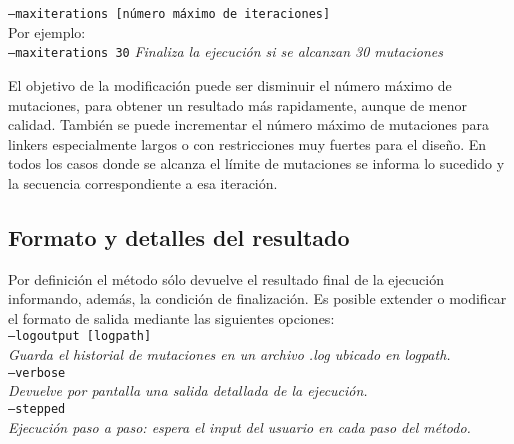 \indent \texttt{--maxiterations [número máximo de iteraciones]} 
\\Por ejemplo: \\
\indent \texttt{--maxiterations 30} \hspace{0.5cm} \textit{Finaliza la ejecución si se alcanzan 30 mutaciones}


El objetivo de la modificación puede ser disminuir el número máximo de mutaciones, para obtener un resultado más rapidamente, aunque de menor calidad. También se puede incrementar el número máximo de mutaciones para linkers especialmente largos o con restricciones muy fuertes para el diseño.
En todos los casos donde se alcanza el límite de mutaciones se informa lo sucedido y la secuencia correspondiente a esa iteración. 

\subsection{Formato y detalles del resultado}\label{output}

Por definición el método sólo devuelve el resultado final de la ejecución informando, además, la condición de finalización.
Es posible extender o modificar el formato de salida mediante las siguientes opciones:
\vspace{0.2cm}\\
\indent \texttt{--logoutput [logpath]} \\
\indent \indent \textit{Guarda el historial de mutaciones en un archivo .log ubicado en logpath.} \\
\indent \texttt{--verbose} \\
\indent \indent \textit{Devuelve por pantalla una salida detallada de la ejecución.} \\
\indent \texttt{--stepped} \\
\indent \indent \textit{Ejecución paso a paso: espera el input del usuario en cada paso del método.} \\
